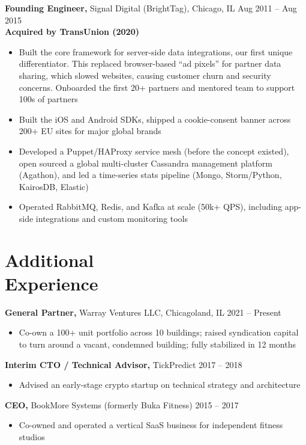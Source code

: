 \begin{resume}
{\bf Founding Engineer,} Signal Digital (BrightTag), Chicago, IL \hfill Aug 2011 -- Aug 2015 \\
{\bf Acquired by TransUnion (2020) }
\nopagebreak[4]
\begin{itemize} \itemsep -2pt  %
  \item Built the core framework for server-side data integrations, our first unique differentiator.
        This replaced browser-based ``ad pixels'' for partner data sharing, which slowed websites, causing
        customer churn and security concerns. Onboarded the first 20+ partners and mentored team to support
        100s of partners
  \item Built the iOS and Android SDKs, shipped a cookie-consent banner across 200+ EU sites for major global brands 
  \item Developed a Puppet/HAProxy service mesh (before the concept existed), open sourced a global multi-cluster Cassandra
        management platform (Agathon), and led a time-series stats pipeline (Mongo, Storm/Python, KairosDB, Elastic)
  \item Operated RabbitMQ, Redis, and Kafka at scale (50k+ QPS), including app-side integrations and custom monitoring tools
 \end{itemize}

\section{Additional \\ Experience}

{\bf General Partner,} Warray Ventures LLC, Chicagoland, IL \hfill 2021 -- Present
\nopagebreak[4]
\begin{itemize} \itemsep -2pt
  \item Co-own a 100+ unit portfolio across 10 buildings; raised syndication capital
        to turn around a vacant, condemned building; fully stabilized in 12 months
\end{itemize}

{\bf Interim CTO / Technical Advisor,} TickPredict \hfill 2017 -- 2018
\nopagebreak[4]
\begin{itemize} \itemsep -2pt
  \item Advised an early-stage crypto startup on technical strategy and architecture
\end{itemize}

{\bf CEO,} BookMore Systems (formerly Buka Fitness) \hfill 2015 -- 2017
\nopagebreak[4]
\begin{itemize} \itemsep -2pt
  \item Co-owned and operated a vertical SaaS business for independent fitness studios
\end{itemize}


\end{resume}
